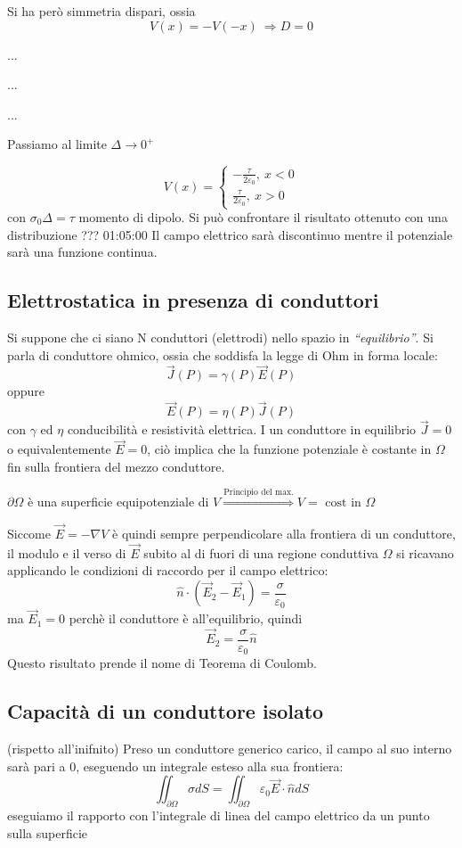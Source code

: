 Si ha però simmetria dispari, ossia 
$$
V(x) = - V(-x) \ \Rightarrow D = 0
$$

...

...

...

Passiamo al limite $\Delta \to 0^+$

$$
V(x) = \begin{cases}
-\frac{\tau}{2\varepsilon_0},\ x < 0 \\
\frac{\tau}{2\varepsilon_0},\ x > 0
\end{cases}
$$
con $\sigma_0 \Delta = \tau $ momento di dipolo.
Si può confrontare il risultato ottenuto con una distribuzione ??? 01:05:00
Il campo elettrico sarà discontinuo mentre il potenziale sarà una funzione continua.

\subsection{Elettrostatica in presenza di conduttori}
Si suppone che ci siano N conduttori (elettrodi) nello spazio in \textit{``equilibrio''}.
Si parla di conduttore ohmico, ossia che soddisfa la legge di Ohm in forma locale:
$$
\vec{J}(P) = \gamma(P)\vec{E}(P)
$$
oppure
$$
\vec{E}(P) = \eta(P)\vec{J}(P)
$$
con $\gamma$ ed $\eta$ conducibilità e resistività elettrica.
I un conduttore in equilibrio $\vec{J} = 0$ o equivalentemente $\vec{E} = 0$, ciò implica 
che la funzione potenziale è costante in $\Omega$ fin sulla frontiera del mezzo conduttore.

$\partial \Omega$ è una superficie equipotenziale di $V \stackrel{\text{Principio del max.}}{\Rightarrow} V = \text{ cost in } \Omega$

Siccome $\vec{E} = -\nabla V$ è quindi sempre perpendicolare alla frontiera di un conduttore,
il modulo e il verso di $\vec{E}$ subito al di fuori di una regione conduttiva $\Omega$ 
si ricavano applicando le condizioni di raccordo per il campo elettrico:
$$
\hat{n}\cdot (\vec{E}_2-\vec{E}_1) = \frac{\sigma}{\varepsilon_0}
$$
ma $\vec{E}_1 = 0$ perchè il conduttore è all'equilibrio, quindi 
$$
\vec{E}_2 = \frac{\sigma}{\varepsilon_0} \hat{n}
$$
Questo risultato prende il nome di Teorema di Coulomb.



\subsection{Capacità di un conduttore isolato} (rispetto all'inifnito)
Preso un conduttore generico carico, il campo al suo interno sarà pari a 0, eseguendo un integrale
esteso alla sua frontiera:
$$
\iint_{\partial \Omega}\sigma dS = \iint_{\partial \Omega} \varepsilon_0 \vec{E}\cdot \hat{n} dS
$$
eseguiamo il rapporto con l'integrale di linea del campo elettrico da un punto sulla superficie

